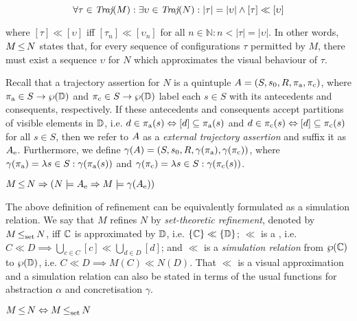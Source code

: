 \begin{equation*}
\forall \tau \in \operatorname{\textit{Traj}}(M) : \exists \upsilon \in \operatorname{\textit{Traj}}(N) : | \tau | = | \upsilon | \wedge [\tau] \ll [\upsilon]
\end{equation*}

\noindent where $[\tau] \ll [\upsilon]$ iff $[\tau_{n}] \ll [\upsilon_{n}]$ for all $n \in \mathbb{N} : n < | \tau | = | \upsilon |$. In other words, $M \operatorname{\leq} N$ states that, for every sequence of configurations $\tau$ permitted by $M$, there must exist a sequence $\upsilon$ for $N$ which approximates the visual behaviour of $\tau$.

Recall that a trajectory assertion for $N$ is a quintuple $A = (S, s_{0}, R, \operatorname{\pi_{\textrm{a}}}, \operatorname{\pi_{\textrm{c}}})$, where $\operatorname{\pi_{\textrm{a}}} \in S \rightarrow \wp(\mathbb{D})$ and $\operatorname{\pi_{\textrm{c}}} \in S \rightarrow \wp(\mathbb{D})$ label each $s \in S$ with its antecedents and consequents, respectively. If these antecedents and consequents accept partitions of visible elements in $\mathbb{D}$, i.e. $d \in \operatorname{\pi_{\textrm{a}}}(s) \Leftrightarrow [d] \subseteq \operatorname{\pi_{\textrm{a}}}(s)$ and $d \in \operatorname{\pi_{\textrm{c}}}(s) \Leftrightarrow [d] \subseteq \operatorname{\pi_{\textrm{c}}}(s)$ for all $s \in S$, then we refer to $A$ as a \textit{external trajectory assertion} and suffix it as $A_{\textrm{e}}$. Furthermore, we define $\gamma(A) = (S, s_{0}, R, \gamma(\operatorname{\pi_{\textrm{a}}}), \gamma(\operatorname{\pi_{\textrm{c}}}))$, where $\gamma(\operatorname{\pi_{\textrm{a}}}) = \lambda s \in S : \gamma(\operatorname{\pi_{\textrm{a}}}(s))$ and $\gamma(\operatorname{\pi_{\textrm{c}}}) = \lambda s \in S : \gamma(\operatorname{\pi_{\textrm{c}}}(s))$.


\begin{theorem} \label{thm:traj-refines}
$M \operatorname{\leq} N \Rightarrow (N \models A_{\textrm{e}} \Rightarrow M \models \gamma(A_{\textrm{e}}))$
\end{theorem}

The above definition of refinement can be equivalently formulated as a simulation relation. We say that $M$ refines $N$ by \textit{set-theoretic refinement}, denoted by $M \operatorname{\operatorname{\leq}_{\textrm{set}}} N$, iff $\mathbb{C}$ is approximated by $\mathbb{D}$, i.e. $\{ \mathbb{C} \} \ll \{ \mathbb{D} \}$; $\ll$ is a , i.e. $C \ll D \implies \bigcup_{c \in C}[c] \ll \bigcup_{d \in D}[d]$; and $\ll$ is a \textit{simulation relation} from $\wp(\mathbb{C})$ to $\wp(\mathbb{D})$, i.e. $C \ll D \implies M(C) \ll N(D)$. That $\ll$ is a visual approximation and a simulation relation can also be stated in terms of the usual functions for abstraction $\alpha$ and concretisation $\gamma$.

\begin{theorem} \label{thm:traj-equal-set}
$M \operatorname{\leq} N \Leftrightarrow M \operatorname{\operatorname{\leq}_{\textrm{set}}} N$
\end{theorem}
